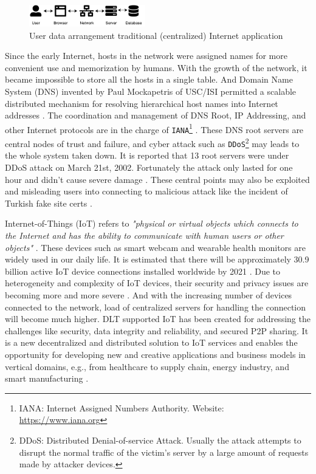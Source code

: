 \begin{figure}[h]
    \includegraphics[width=0.45\textwidth,trim={-1cm 0 0.25cm 0},clip]{figs/traditional_internet.pdf}
    \caption{User data arrangement traditional (centralized) Internet application}
    \label{fig:traditional_internet}
\end{figure}

Since the early Internet, hosts in the network were assigned names for more convenient use and memorization by humans. With the growth of the network, it became impossible to store all the hosts in a single table.
And Domain Name System (DNS) invented by Paul Mockapetris of USC/ISI permitted a scalable distributed mechanism for resolving hierarchical host names into Internet addresses \cite{leiner2009brief}.
The coordination and management of DNS Root, IP Addressing, and other Internet protocols are in the charge of \texttt{IANA}\footnote{IANA: Internet Assigned Numbers Authority. Website: \url{https://www.iana.org}} \cite{Postel1994DomainNS}.
These DNS root servers are central nodes of trust and failure, and cyber attack such as \texttt{DDoS}\footnote{DDoS: Distributed Denial-of-service Attack.
    Usually the attack attempts to disrupt the normal traffic of the victim's server by a large amount of requests made by attacker devices.} may leads to the whole system taken down.
It is reported that 13 root servers were under DDoS attack on March 21st, 2002. Fortunately the attack only lasted for one hour and didn't cause severe damage \cite{mcguire2002attack}.
These central points may also be exploited and misleading users into connecting to malicious attack like the incident of Turkish fake site certs \cite{rosenblatt_2013}.


Internet-of-Things (IoT) refers to \textit{"physical or virtual objects which connects to the Internet and has the ability to communicate with human users or other objects"} \cite{6978614}.
These devices such as smart webcam and wearable health monitors are widely used in our daily life.
It is estimated that there will be approximately 30.9 billion active IoT device connections installed worldwide by 2021 \cite{statista_2021}.
Due to heterogeneity and complexity of IoT devices, their security and privacy issues are becoming more and more severe \cite{6978614}.
And with the increasing number of devices connected to the network, load of centralized servers for handling the connection will become much higher.
DLT supported IoT has been created for addressing the challenges like security, data integrity and reliability, and secured P2P sharing. 
It is a new decentralized and distributed solution to IoT services and enables the opportunity for developing new and creative applications and business models in vertical domains, e.g., from healthcare to supply chain, energy industry, and smart manufacturing \cite{Farahani2020TheCO}.



